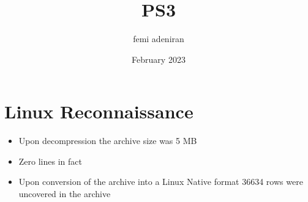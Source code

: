 \documentclass{article}
\title{PS3}
\author{femi adeniran}
\date{February 2023}
\begin{document}
\maketitle

\section{Linux Reconnaissance }
    \begin{itemize}
         \item {Upon decompression the archive size was 5 MB }
         \item {Zero lines in fact  }
        \item {Upon conversion of the archive into a Linux Native format 
        36634 rows were uncovered in the archive }
    \end{itemize} 
\end{document}
